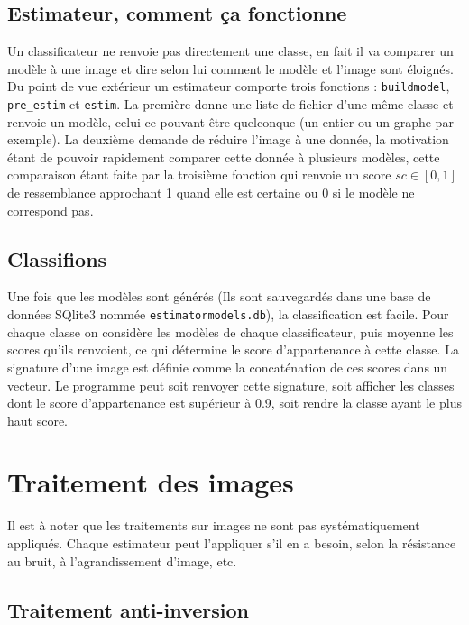 \documentclass{article}
\begin{document}
  	   \subsection{Estimateur, comment ça fonctionne}
	Un classificateur ne renvoie pas directement une classe, en fait il va comparer un modèle à une image et dire selon lui comment le modèle et l'image sont éloignés. Du point de vue extérieur un estimateur comporte trois fonctions : \verb-buildmodel-, \verb-pre_estim- et \verb-estim-. La première donne une liste de fichier d'une même classe et renvoie un modèle, celui-ce pouvant être quelconque (un entier ou un graphe par exemple). La deuxième demande de réduire l'image à une donnée, la motivation étant de pouvoir rapidement comparer cette donnée à plusieurs modèles, cette comparaison étant faite par la troisième fonction qui renvoie un score $sc \in [0,1]$ de ressemblance approchant 1 quand elle est certaine ou 0 si le modèle ne correspond pas.

  	   \subsection{Classifions}
  	   Une fois que les modèles sont générés (Ils sont sauvegardés dans une base de données SQlite3 nommée \verb-estimatormodels.db-), la classification est facile. Pour chaque classe on considère les modèles de chaque classificateur, puis moyenne les scores qu'ils renvoient, ce qui détermine le score d'appartenance à cette classe. La signature d'une image est définie comme la concaténation de ces scores dans un vecteur. Le programme peut soit renvoyer cette signature, soit afficher les classes dont le score d'appartenance est supérieur à 0.9, soit rendre la classe ayant le plus haut score.
  
  \section{Traitement des images}
  
  	Il est à noter que les traitements sur images ne sont pas systématiquement appliqués. Chaque estimateur peut l'appliquer s'il en a besoin, selon la résistance au bruit, à l'agrandissement d'image, etc.
  
    \subsection{Traitement anti-inversion}
    
\end{document}

